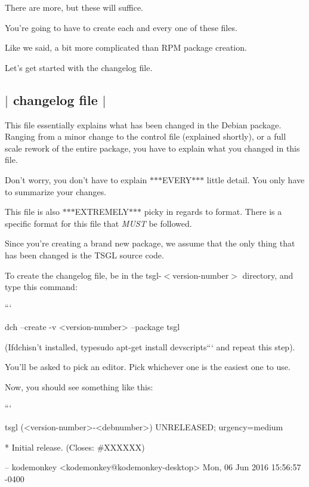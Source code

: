 There are more, but these will suffice.

You're going to have to create each and every one of these files.

Like we said, a bit more complicated than R\-P\-M package creation.

Let's get started with the {\ttfamily changelog} file. 

 \subsection*{$\vert$ {\ttfamily changelog} file $\vert$ }

This file essentially explains what has been changed in the Debian package. Ranging from a minor change to the {\ttfamily control} file (explained shortly), or a full scale rework of the entire package, you have to explain what you changed in this file.

Don't worry, you don't have to explain $\ast$$\ast$$\ast$\-E\-V\-E\-R\-Y$\ast$$\ast$$\ast$ little detail. You only have to summarize your changes.

This file is also $\ast$$\ast$$\ast$\-E\-X\-T\-R\-E\-M\-E\-L\-Y$\ast$$\ast$$\ast$ picky in regards to format. There is a specific format for this file that {\itshape M\-U\-S\-T} be followed.

Since you're creating a brand new package, we assume that the only thing that has been changed is the T\-S\-G\-L source code.

To create the {\ttfamily changelog} file, be in the {\ttfamily tsgl-\/$<$version-\/number$>$} directory, and type this command\-:

``` \begin{DoxyVerb}dch --create -v <version-number> --package tsgl
\end{DoxyVerb}


{\ttfamily  (If}dch{\ttfamily isn't installed, type}sudo apt-\/get install devscripts``` and repeat this step).

You'll be asked to pick an editor. Pick whichever one is the easiest one to use.

Now, you should see something like this\-:

``` \begin{DoxyVerb}tsgl (<version-number>-<debnumber>) UNRELEASED; urgency=medium

  * Initial release. (Closes: #XXXXXX)

 -- kodemonkey <kodemonkey@kodemonkey-desktop>  Mon, 06 Jun 2016 15:56:57 -0400
\end{DoxyVerb}


